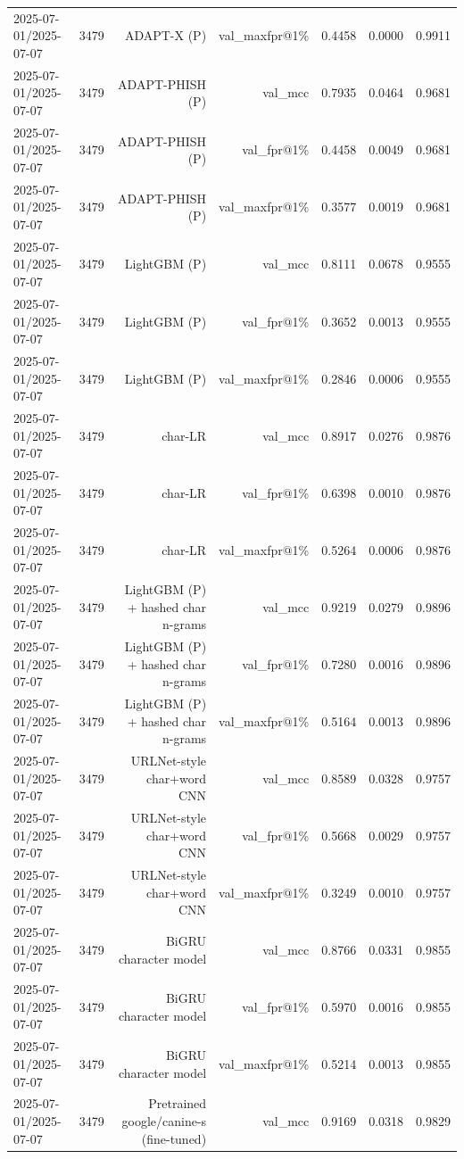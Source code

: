 \begin{table}[t]
\begin{tabular}{llrrrrr}
2025-07-01/2025-07-07 & 3479 & ADAPT-X (P) & val\_maxfpr@1\% & 0.4458 & 0.0000 & 0.9911 \\
2025-07-01/2025-07-07 & 3479 & ADAPT-PHISH (P) & val\_mcc & 0.7935 & 0.0464 & 0.9681 \\
2025-07-01/2025-07-07 & 3479 & ADAPT-PHISH (P) & val\_fpr@1\% & 0.4458 & 0.0049 & 0.9681 \\
2025-07-01/2025-07-07 & 3479 & ADAPT-PHISH (P) & val\_maxfpr@1\% & 0.3577 & 0.0019 & 0.9681 \\
2025-07-01/2025-07-07 & 3479 & LightGBM (P) & val\_mcc & 0.8111 & 0.0678 & 0.9555 \\
2025-07-01/2025-07-07 & 3479 & LightGBM (P) & val\_fpr@1\% & 0.3652 & 0.0013 & 0.9555 \\
2025-07-01/2025-07-07 & 3479 & LightGBM (P) & val\_maxfpr@1\% & 0.2846 & 0.0006 & 0.9555 \\
2025-07-01/2025-07-07 & 3479 & char-LR & val\_mcc & 0.8917 & 0.0276 & 0.9876 \\
2025-07-01/2025-07-07 & 3479 & char-LR & val\_fpr@1\% & 0.6398 & 0.0010 & 0.9876 \\
2025-07-01/2025-07-07 & 3479 & char-LR & val\_maxfpr@1\% & 0.5264 & 0.0006 & 0.9876 \\
2025-07-01/2025-07-07 & 3479 & LightGBM (P) + hashed char n-grams & val\_mcc & 0.9219 & 0.0279 & 0.9896 \\
2025-07-01/2025-07-07 & 3479 & LightGBM (P) + hashed char n-grams & val\_fpr@1\% & 0.7280 & 0.0016 & 0.9896 \\
2025-07-01/2025-07-07 & 3479 & LightGBM (P) + hashed char n-grams & val\_maxfpr@1\% & 0.5164 & 0.0013 & 0.9896 \\
2025-07-01/2025-07-07 & 3479 & URLNet-style char+word CNN & val\_mcc & 0.8589 & 0.0328 & 0.9757 \\
2025-07-01/2025-07-07 & 3479 & URLNet-style char+word CNN & val\_fpr@1\% & 0.5668 & 0.0029 & 0.9757 \\
2025-07-01/2025-07-07 & 3479 & URLNet-style char+word CNN & val\_maxfpr@1\% & 0.3249 & 0.0010 & 0.9757 \\
2025-07-01/2025-07-07 & 3479 & BiGRU character model & val\_mcc & 0.8766 & 0.0331 & 0.9855 \\
2025-07-01/2025-07-07 & 3479 & BiGRU character model & val\_fpr@1\% & 0.5970 & 0.0016 & 0.9855 \\
2025-07-01/2025-07-07 & 3479 & BiGRU character model & val\_maxfpr@1\% & 0.5214 & 0.0013 & 0.9855 \\
2025-07-01/2025-07-07 & 3479 & Pretrained google/canine-s (fine-tuned) & val\_mcc & 0.9169 & 0.0318 & 0.9829 \\

\end{tabular}
\end{table}

